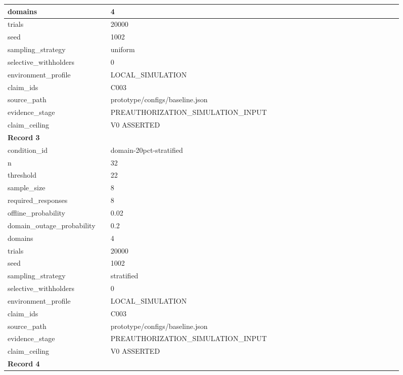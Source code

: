 \begin{longtable}{|p{0.24\linewidth}|p{0.68\linewidth}|}
domains & 4 \\ \hline
trials & 20000 \\ \hline
seed & 1002 \\ \hline
sampling\_\allowbreak{}strategy & uniform \\ \hline
selective\_\allowbreak{}withholders & 0 \\ \hline
environment\_\allowbreak{}profile & LOCAL\_\allowbreak{}SIMULATION \\ \hline
claim\_\allowbreak{}ids & C003 \\ \hline
source\_\allowbreak{}path & prototype/configs/baseline.json \\ \hline
evidence\_\allowbreak{}stage & PREAUTHORIZATION\_\allowbreak{}SIMULATION\_\allowbreak{}INPUT \\ \hline
claim\_\allowbreak{}ceiling & V0 ASSERTED \\ \hline
\multicolumn{2}{|l|}{\textbf{Record 3}} \\ \hline
condition\_\allowbreak{}id & domain-20pct-stratified \\ \hline
n & 32 \\ \hline
threshold & 22 \\ \hline
sample\_\allowbreak{}size & 8 \\ \hline
required\_\allowbreak{}responses & 8 \\ \hline
offline\_\allowbreak{}probability & 0.02 \\ \hline
domain\_\allowbreak{}outage\_\allowbreak{}probability & 0.2 \\ \hline
domains & 4 \\ \hline
trials & 20000 \\ \hline
seed & 1002 \\ \hline
sampling\_\allowbreak{}strategy & stratified \\ \hline
selective\_\allowbreak{}withholders & 0 \\ \hline
environment\_\allowbreak{}profile & LOCAL\_\allowbreak{}SIMULATION \\ \hline
claim\_\allowbreak{}ids & C003 \\ \hline
source\_\allowbreak{}path & prototype/configs/baseline.json \\ \hline
evidence\_\allowbreak{}stage & PREAUTHORIZATION\_\allowbreak{}SIMULATION\_\allowbreak{}INPUT \\ \hline
claim\_\allowbreak{}ceiling & V0 ASSERTED \\ \hline
\multicolumn{2}{|l|}{\textbf{Record 4}} \\ \hline

\end{longtable}
